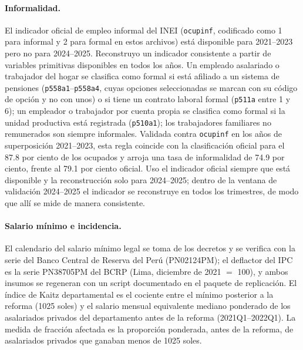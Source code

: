\paragraph{Informalidad.} El indicador oficial de empleo informal del INEI (\texttt{ocupinf}, codificado como 1 para informal y 2 para formal en estos archivos) está disponible para 2021--2023 pero no para 2024--2025. Reconstruyo un indicador consistente a partir de variables primitivas disponibles en todos los años. Un empleado asalariado o trabajador del hogar se clasifica como formal si está afiliado a un sistema de pensiones (\texttt{p558a1}--\texttt{p558a4}, cuyas opciones seleccionadas se marcan con su código de opción y no con unos) o si tiene un contrato laboral formal (\texttt{p511a} entre 1 y 6); un empleador o trabajador por cuenta propia se clasifica como formal si la unidad productiva está registrada (\texttt{p510a1}); los trabajadores familiares no remunerados son siempre informales. Validada contra \texttt{ocupinf} en los años de superposición 2021--2023, esta regla coincide con la clasificación oficial para el 87.8 por ciento de los ocupados y arroja una tasa de informalidad de 74.9 por ciento, frente al 79.1 por ciento oficial. Uso el indicador oficial siempre que está disponible y la reconstrucción solo para 2024--2025; dentro de la ventana de validación 2024--2025 el indicador se reconstruye en todos los trimestres, de modo que allí se mide de manera consistente.

\paragraph{Salario mínimo e incidencia.} El calendario del salario mínimo legal se toma de los decretos y se verifica con la serie del Banco Central de Reserva del Perú (PN02124PM); el deflactor del IPC es la serie PN38705PM del BCRP (Lima, diciembre de 2021 $=$ 100), y ambos insumos se regeneran con un script documentado en el paquete de replicación. El índice de Kaitz departamental es el cociente entre el mínimo posterior a la reforma (1025 soles) y el salario mensual equivalente mediano ponderado de los asalariados privados del departamento antes de la reforma (2021Q1--2022Q1). La medida de fracción afectada es la proporción ponderada, antes de la reforma, de asalariados privados que ganaban menos de 1025 soles.

